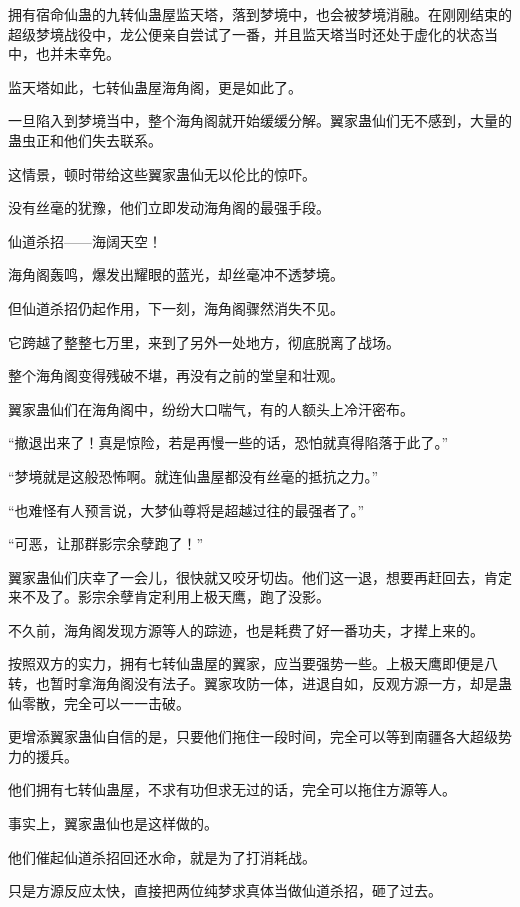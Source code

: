 
\begin{this_body}

拥有宿命仙蛊的九转仙蛊屋监天塔，落到梦境中，也会被梦境消融。在刚刚结束的超级梦境战役中，龙公便亲自尝试了一番，并且监天塔当时还处于虚化的状态当中，也并未幸免。

监天塔如此，七转仙蛊屋海角阁，更是如此了。

一旦陷入到梦境当中，整个海角阁就开始缓缓分解。翼家蛊仙们无不感到，大量的蛊虫正和他们失去联系。

这情景，顿时带给这些翼家蛊仙无以伦比的惊吓。

没有丝毫的犹豫，他们立即发动海角阁的最强手段。

仙道杀招——海阔天空！

海角阁轰鸣，爆发出耀眼的蓝光，却丝毫冲不透梦境。

但仙道杀招仍起作用，下一刻，海角阁骤然消失不见。

它跨越了整整七万里，来到了另外一处地方，彻底脱离了战场。

整个海角阁变得残破不堪，再没有之前的堂皇和壮观。

翼家蛊仙们在海角阁中，纷纷大口喘气，有的人额头上冷汗密布。

“撤退出来了！真是惊险，若是再慢一些的话，恐怕就真得陷落于此了。”

“梦境就是这般恐怖啊。就连仙蛊屋都没有丝毫的抵抗之力。”

“也难怪有人预言说，大梦仙尊将是超越过往的最强者了。”

“可恶，让那群影宗余孽跑了！”

翼家蛊仙们庆幸了一会儿，很快就又咬牙切齿。他们这一退，想要再赶回去，肯定来不及了。影宗余孽肯定利用上极天鹰，跑了没影。

不久前，海角阁发现方源等人的踪迹，也是耗费了好一番功夫，才撵上来的。

按照双方的实力，拥有七转仙蛊屋的翼家，应当要强势一些。上极天鹰即便是八转，也暂时拿海角阁没有法子。翼家攻防一体，进退自如，反观方源一方，却是蛊仙零散，完全可以一一击破。

更增添翼家蛊仙自信的是，只要他们拖住一段时间，完全可以等到南疆各大超级势力的援兵。

他们拥有七转仙蛊屋，不求有功但求无过的话，完全可以拖住方源等人。

事实上，翼家蛊仙也是这样做的。

他们催起仙道杀招回还水命，就是为了打消耗战。

只是方源反应太快，直接把两位纯梦求真体当做仙道杀招，砸了过去。


\end{this_body}
